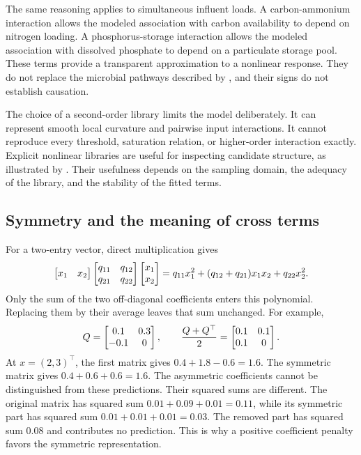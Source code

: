 The same reasoning applies to simultaneous influent loads. A carbon-ammonium interaction allows the modeled association with carbon availability to depend on nitrogen loading. A phosphorus-storage interaction allows the modeled association with dissolved phosphate to depend on a particulate storage pool. These terms provide a transparent approximation to a nonlinear response. They do not replace the microbial pathways described by \citet{Henze1999}, and their signs do not establish causation.

The choice of a second-order library limits the model deliberately. It can represent smooth local curvature and pairwise input interactions. It cannot reproduce every threshold, saturation relation, or higher-order interaction exactly. Explicit nonlinear libraries are useful for inspecting candidate structure, as illustrated by \citet{Brunton2016}. Their usefulness depends on the sampling domain, the adequacy of the library, and the stability of the fitted terms.

\subsection{Symmetry and the meaning of cross terms}

For a two-entry vector, direct multiplication gives
\begin{equation}
\equationname{Expansion of a two-variable quadratic form}
\label{eq:icsor_scalar_quadratic}
\begin{bmatrix}x_1&x_2\end{bmatrix}
\begin{bmatrix}q_{11}&q_{12}\\q_{21}&q_{22}\end{bmatrix}
\begin{bmatrix}x_1\\x_2\end{bmatrix}
=q_{11}x_1^2+(q_{12}+q_{21})x_1x_2+q_{22}x_2^2.
\end{equation}
Only the sum of the two off-diagonal coefficients enters this polynomial. Replacing them by their average leaves that sum unchanged. For example,
\begin{equation}
\equationname{Numerical example of quadratic-coefficient symmetrization}
\label{eq:icsor_symmetry_numbers}
Q=\begin{bmatrix}0.1&0.3\\-0.1&0\end{bmatrix},
\qquad
\frac{Q+Q^\top}{2}=\begin{bmatrix}0.1&0.1\\0.1&0\end{bmatrix}.
\end{equation}
At \(x=(2,3)^\top\), the first matrix gives \(0.4+1.8-0.6=1.6\). The symmetric matrix gives \(0.4+0.6+0.6=1.6\). The asymmetric coefficients cannot be distinguished from these predictions. Their squared sums are different. The original matrix has squared sum \(0.01+0.09+0.01=0.11\), while its symmetric part has squared sum \(0.01+0.01+0.01=0.03\). The removed part has squared sum 0.08 and contributes no prediction. This is why a positive coefficient penalty favors the symmetric representation.


